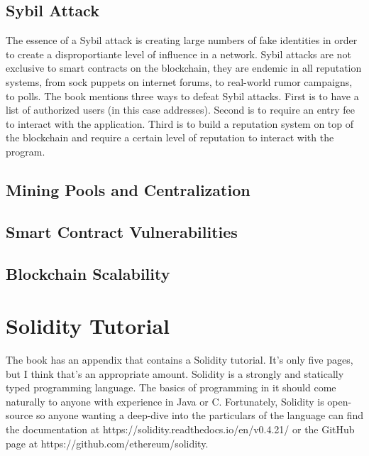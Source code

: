 \documentclass{article}
\begin{document}
\subsection{Sybil Attack}
The essence of a Sybil attack is creating large numbers of fake identities in order to create a disproportiante level of influence
in a network. Sybil attacks are not exclusive to smart contracts on the blockchain, they are endemic in all reputation systems, from
sock puppets on internet forums, to real-world rumor campaigns, to polls. The book mentions three ways to defeat Sybil attacks.
First is to have a list of authorized users (in this case addresses). Second is to require an entry fee to interact with the application.
Third is to build a reputation system on top of the blockchain and require a certain level of reputation to interact with the program.

\subsection{Mining Pools and Centralization}

\subsection{Smart Contract Vulnerabilities}

\subsection{Blockchain Scalability}

\section{Solidity Tutorial}
The book has an appendix that contains a Solidity tutorial. It's only five pages, but I think that's an appropriate amount. Solidity is a strongly and statically typed programming language. The basics of programming in it should come naturally to anyone with experience in Java or C. Fortunately, Solidity is open-source so
anyone wanting a deep-dive into the particulars of the language can find the documentation at https://solidity.readthedocs.io/en/v0.4.21/ or the GitHub page at https://github.com/ethereum/solidity.
\end{document}

